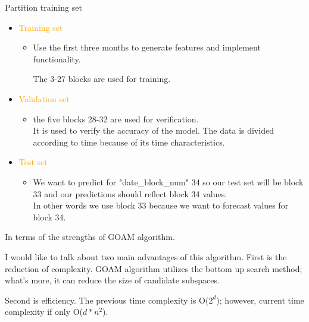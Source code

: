 \documentclass[
 size=14pt,
 paper=smartboard,  %
 mode=present, 		%
 display=slides, 	%
 style=tuliplab,  	%
 pauseslide,
 fleqn,leqno]{powerdot}
\begin{document}
\begin{slide}[toc=,bm=]{Partition training set}
  \begin{itemize}
  \item
  \textcolor{orange}{Training set}
  
  \begin{itemize}
  \item
  Use the first three months to generate features and implement functionality.
  
  The 3-27 blocks are used for training.
  
  
  
  \end{itemize}
  
  \item
  \textcolor{orange}{Validation set}
  
  \begin{itemize}
  \item
  the five blocks 28-32 are used for verification.\\
  It is used to verify the accuracy of the model. The data is divided according to time because of its time characteristics.
  
  \end{itemize}
  \item
  \textcolor{orange}{Test set}
  
  \begin{itemize}
  \item
  We want to predict for "date_block_num" 34 so our test set will be block 33 and our predictions should reflect block 34 values.\\
  In other words we use block 33 because we want to forecast values for block 34.
  
  \end{itemize}
  \end{itemize}
  
  \begin{note}
  In terms of the strengths of GOAM algorithm.
  
  I would like to talk about two main advantages of this algorithm.
  First is the reduction of complexity.
  GOAM algorithm utilizes the bottom up search method;
  what's more,
  it can reduce the size of candidate subspaces.
  
  Second is efficiency.
  The previous time complexity is O($2^d$);
  however,
  current time complexity if only O($d*n^2$).
  \end{note}
  
  \end{slide}
\end{document}
